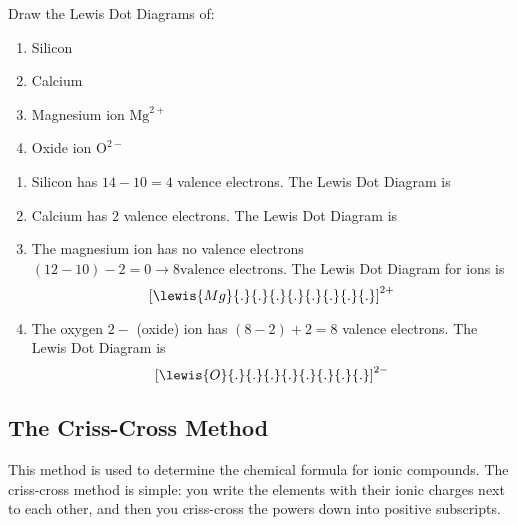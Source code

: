 \documentclass[12pt]{report}
\begin{document}
\begin{+problems}
    \item{Draw the Lewis Dot Diagrams of:}
        \begin{enumerate}[label=(\alph*)]
           \item{Silicon}
           \item{Calcium}
           \item{Magnesium ion $ \text{Mg}^{2+}$}
           \item{Oxide ion $ \text{O}^{2-}$}
        \end{enumerate}
    \begin{solution}
       \begin{enumerate}[label=(\alph*)]
           \item{Silicon has $14-10=4$ valence electrons. The Lewis Dot Diagram is 
                   \begin{center}
                   \end{center}
                   
               }
            \item{Calcium has $2$ valence electrons. The Lewis Dot Diagram is 
                    \begin{center}
                    \end{center}
                }
            \item{The magnesium ion has no valence electrons $(12-10)-2=0\to8 \text{valence electrons}$. The Lewis Dot Diagram for ions is 
                    \[
                        \left[ \lewis{Mg}{.}{.}{.}{.}{.}{.}{.}{.} \right]^{2+}
                    \]
                }
            \item{The oxygen $2-$ (oxide) ion has $(8-2)+2=8$ valence electrons. The Lewis Dot Diagram is 
                    \[
                        \left[ \lewis{O}{.}{.}{.}{.}{.}{.}{.}{.} \right]^{2-}
                    \]
                }
       \end{enumerate} 
    \end{solution}
\end{+problems}

\subsection{The Criss-Cross Method}\label{section:crisscross}
This method is used to determine the chemical formula for ionic compounds. The criss-cross method is simple: you write the elements with their ionic charges next to each other, and then you criss-cross the powers down into positive subscripts.\\ 
\end{document}
